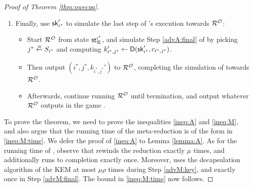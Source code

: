 \begin{proof}[Proof of Theorem \ref{thm:owecpa}]
\begin{enumerate}[itemsep=0.1cm]
    \item\label{advM:final} Finally, use \(\mathsf{sk}_{i^{*}}'\) to simulate the
          last step of \advA's execution towards \(\redR^{\oracle}\):
          \begin{itemize}[label={\textbullet},itemsep=0.1cm]
            \item Start \(\redR^{\oracle}\) from state \(\state_{\redR}^{i^{*}}\),
                  and simulate Step \ref{advA:final} of \advA by picking \(j^{*} \sampleR S_{i^{*}}\)
                  and computing \(k_{i^{*},j^{*}}' \leftarrow \mathsf{D}(\mathsf{sk}_{i^{*}}',c_{i^{*},j^{*}})\).
            \item Then output \((i^{*},j^{*}, k_{i^{*},j^{*}}')\) to \(\redR^{\oracle}\),
                  completing the simulation of \advA towards \(\redR^{\oracle}\).
            \item Afterwards, continue running \(\redR^{\oracle}\)
                  until termination, and output whatever \(\redR^{\oracle}\)
                  outputs in the game \SICA.
          \end{itemize}
  \end{enumerate}

  To prove the theorem, we need to prove the inequalities \eqref{ineq:A} and \eqref{ineq:M},
  and also argue that the running time of the meta-reduction \redM is of the form in \eqref{ineq:M:time}.
  We defer the proof of \eqref{ineq:A} to Lemma \ref{lemma:A}.
  As for the running time of \redM,
  observe that \redM rewinds the reduction \redR exactly \(\mu\) times,
  and additionally runs \redR to completion exactly once.
  Moreover, \redM uses the decapsulation algorithm \Decaps of the KEM \KEM
  at most \(\mu \rho\) times during Step \ref{advM:key},
  and exactly once in Step \ref{advM:final}.
  The bound in \eqref{ineq:M:time} now follows.


\end{proof}
